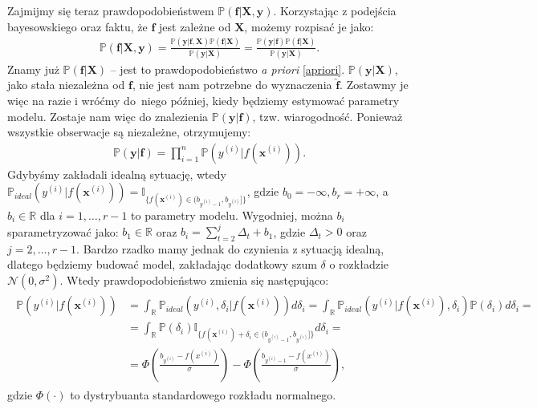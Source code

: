 \documentclass{mini}
\begin{document}
Zajmijmy się teraz prawdopodobieństwem $\mathbb{P}(\mathbf{f} | \textbf{X}, \textbf{y})$. Korzystając z podejścia bayesowskiego oraz faktu, że $\textbf{f}$ jest zależne od $\textbf{X}$, możemy rozpisać je jako:
\begin{align}\label{bayes}
\mathbb{P}(\mathbf{f} | \textbf{X}, \textbf{y}) 
=
\frac{
\mathbb{P}(\mathbf{y} | \textbf{f}, \textbf{X})
\mathbb{P}(\mathbf{f} | \textbf{X})
}{
\mathbb{P}(\mathbf{y} | \textbf{X})
}
=
\frac{
\mathbb{P}(\mathbf{y} | \textbf{f})
\mathbb{P}(\mathbf{f} | \textbf{X})
}{
\mathbb{P}(\mathbf{y} | \textbf{X})
}.
\end{align}
Znamy już $\mathbb{P}(\mathbf{f} | \textbf{X})$ -- jest to prawdopodobieństwo \textit{a priori} \eqref{apriori}. $\mathbb{P}(\mathbf{y} | \textbf{X})$, jako stała niezależna od $\mathbf{f}$, nie jest nam potrzebne do wyznaczenia $\mathbf{\hat{f}}$. Zostawmy je więc na razie i wróćmy do~niego później, kiedy będziemy estymować parametry modelu. Zostaje nam więc do znalezienia $\mathbb{P}(\mathbf{y} | \textbf{f})$, tzw. wiarogodność. Ponieważ wszystkie obserwacje są niezależne, otrzymujemy:
\begin{align}\label{prod}
\mathbb{P}(\mathbf{y} | \textbf{f}) 
=
\prod^n_{i=1}\mathbb{P}(y^{(i)} | f(\mathbf{x}^{(i)})).
\end{align}
Gdybyśmy zakładali idealną sytuację, wtedy $\mathbb{P}_{ideal} (y^{(i)}|f(\mathbf{x}^{(i)})) = \mathbb{I}_{\lbrace f(\mathbf{x}^{(i)})\in (b_{y^{(i)}-1}, b_{y^{(i)}}] \rbrace}$, gdzie $b_0=-\infty, b_r=+\infty$, a $b_i\in\mathbb{R}$ dla $i=1, \ldots, r-1$ to parametry modelu. Wygodniej, można $b_i$ sparametryzować jako: $b_1\in\mathbb{R}$ oraz $b_i = \sum_{t=2}^j\Delta_t+b_1$, gdzie $\Delta_t>0$ oraz $j=2, \ldots, r-1$. Bardzo rzadko mamy jednak do czynienia z sytuacją idealną, dlatego będziemy budować model, zakładając dodatkowy szum $\delta$ o rozkładzie $\mathcal{N}(0, \sigma^2)$. Wtedy prawdopodobieństwo zmienia się następująco:
\begin{align}\label{dystryb}
\begin{split}
\mathbb{P}(y^{(i)}|f(\mathbf{x}^{(i)})) 
&= 
\int_\mathbb{R} \mathbb{P}_{ideal} (y^{(i)},\delta_i | f(\mathbf{x}^{(i)}))d\delta_i
=
\int_\mathbb{R} \mathbb{P}_{ideal} (y^{(i)} | f(\mathbf{x}^{(i)}),\delta_i)\mathbb{P}(\delta_i)  d\delta_i=\\
&=
\int_\mathbb{R} \mathbb{P}(\delta_i)\mathbb{I}_{\lbrace f(\mathbf{x}^{(i)})+\delta_i\in (b_{y^{(i)}-1}, b_{y^{(i)}}] \rbrace}  d\delta_i=\\
&=
\Phi\left(\frac{b_{y^{(i)}}-f(x^{(i)})}{\sigma} \right) 
- 
\Phi\left( \frac{b_{y^{(i)}-1}-f(x^{(i)})}{\sigma} \right),
\end{split}
\end{align}
gdzie $\Phi(\cdot)$ to dystrybuanta standardowego rozkładu normalnego.
\end{document}

